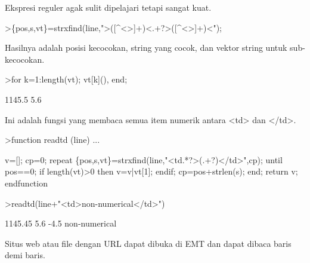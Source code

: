 \documentclass[a4paper,10pt]{article}
\begin{document}
\begin{eulernotebook}
\begin{eulercomment}
\begin{eulercomment}
\begin{eulercomment}
\begin{eulercomment}
\begin{eulercomment}
\begin{eulercomment}
\begin{eulercomment}
\begin{eulercomment}
\begin{eulercomment}
\begin{eulercomment}
\begin{eulercomment}
\begin{eulercomment}
\begin{eulercomment}
\begin{eulercomment}
\begin{eulercomment}
\begin{eulercomment}
\begin{eulercomment}
\begin{eulercomment}
\begin{eulercomment}
Ekspresi reguler agak sulit dipelajari tetapi sangat kuat.
\end{eulercomment}
\begin{eulerprompt}
>\{pos,s,vt\}=strxfind(line,">([^<>]+)<.+?>([^<>]+)<");
\end{eulerprompt}
\begin{eulercomment}
Hasilnya adalah posisi kecocokan, string yang cocok, dan vektor string
untuk sub-kecocokan.
\end{eulercomment}
\begin{eulerprompt}
>for k=1:length(vt); vt[k](), end;
\end{eulerprompt}
\begin{euleroutput}
  1145.5
  5.6
\end{euleroutput}
\begin{eulercomment}
Ini adalah fungsi yang membaca semua item numerik antara \textless{}td\textgreater{} dan
\textless{}/td\textgreater{}.
\end{eulercomment}
\begin{eulerprompt}
>function readtd (line) ...
\end{eulerprompt}
\begin{eulerudf}
  v=[]; cp=0;
  repeat
     \{pos,s,vt\}=strxfind(line,"<td.*?>(.+?)</td>",cp);
     until pos==0;
     if length(vt)>0 then v=v|vt[1]; endif;
     cp=pos+strlen(s);
  end;
  return v;
  endfunction
\end{eulerudf}
\begin{eulerprompt}
>readtd(line+"<td>non-numerical</td>")
\end{eulerprompt}
\begin{euleroutput}
  1145.45
  5.6
  -4.5
  non-numerical
\end{euleroutput}
\begin{eulercomment}
Situs web atau file dengan URL dapat dibuka di EMT dan dapat dibaca
baris demi baris.


\end{eulercomment}
\end{eulercomment}
\end{eulercomment}
\end{eulercomment}
\end{eulercomment}
\end{eulercomment}
\end{eulercomment}
\end{eulercomment}
\end{eulercomment}
\end{eulercomment}
\end{eulercomment}
\end{eulercomment}
\end{eulercomment}
\end{eulercomment}
\end{eulercomment}
\end{eulercomment}
\end{eulercomment}
\end{eulercomment}
\end{eulercomment}
\end{eulernotebook}
\end{document}

